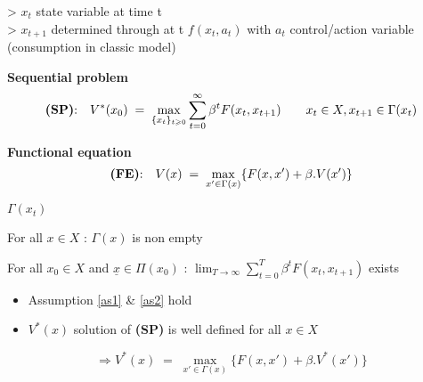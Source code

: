 > $x_{t}$ state variable at time t\\
> $x_{t+1}$ determined through at t $f(x_{t},a_{t})$ with $a_{t}$ control/action variable (consumption in classic model)
\begin{definition}
    \textbf{Sequential problem}
    \vspace{-.3cm}
    \begin{equation*}
        \textrm{\textbf{(SP)}:\quad} V^{*}(x_{0}) \; = \; \max_{\{x_{t}\}_{t\geqslant 0}} \sum_{t = 0}^{\infty}  \beta^{t} F(x_{t},x_{t+1}) \quad \quad x_{t} \in X, x_{t+1} \in \Gamma(x_{t})
    \end{equation*}
\end{definition}

\begin{definition}
    \textbf{Functional equation}
    \vspace{-.3cm}
    \begin{equation*}
        \textrm{\textbf{(FE)}:\quad} V(x) \; = \; \max_{x'\in \Gamma(x)} \{ F(x,x') + \beta .V(x') \}
    \end{equation*}
\end{definition}

$\Gamma(x_{t})$ 

\begin{assumption}\label{as1}
    For all $x \in X$ : $\Gamma(x)$ is non empty
\end{assumption}
\begin{assumption}\label{as2}
    For all $x_{0} \in X$ and $ \underline{x} \in \Pi(x_{0})$ : $\lim_{T \to \infty} \sum_{t = 0}^{T}  \beta^{t} F(x_{t},x_{t+1})$ exists 
\end{assumption}

\begin{boxH}
\begin{theorem}\label{th1}
    \begin{itemize}
        \item Assumption \ref{as1} \& \ref{as2} hold
        \item $V^{*}(x)$ solution of \textbf{(SP)} is well defined for all $x \in X$
    \end{itemize}
    \begin{equation*}
        \Longrightarrow  V^{*}(x) \; = \; \max_{ x'\in \Gamma(x)} \{ F(x,x') + \beta .V^{*}(x') \}    
    \end{equation*}
\end{theorem} 
\end{boxH}

